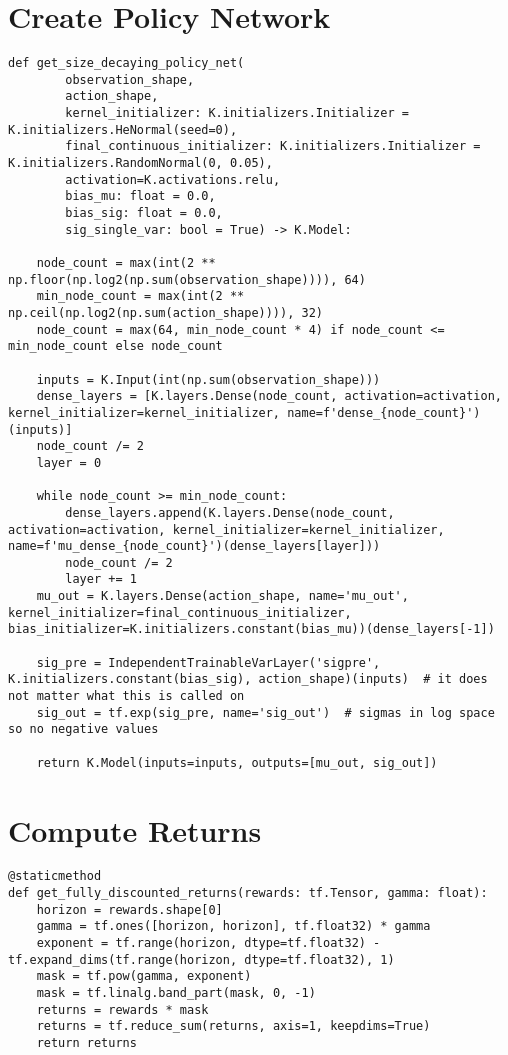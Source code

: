 \section{Create Policy Network}\label{appendix:code:network}
\begin{lstlisting}[basicstyle=\footnotesize]
def get_size_decaying_policy_net(
        observation_shape,
        action_shape,
        kernel_initializer: K.initializers.Initializer = K.initializers.HeNormal(seed=0),
        final_continuous_initializer: K.initializers.Initializer = K.initializers.RandomNormal(0, 0.05),
        activation=K.activations.relu,
        bias_mu: float = 0.0,
        bias_sig: float = 0.0,
        sig_single_var: bool = True) -> K.Model:

    node_count = max(int(2 ** np.floor(np.log2(np.sum(observation_shape)))), 64)
    min_node_count = max(int(2 ** np.ceil(np.log2(np.sum(action_shape)))), 32)
    node_count = max(64, min_node_count * 4) if node_count <= min_node_count else node_count

    inputs = K.Input(int(np.sum(observation_shape)))
    dense_layers = [K.layers.Dense(node_count, activation=activation, kernel_initializer=kernel_initializer, name=f'dense_{node_count}')(inputs)]
    node_count /= 2
    layer = 0
    
    while node_count >= min_node_count:
        dense_layers.append(K.layers.Dense(node_count, activation=activation, kernel_initializer=kernel_initializer, name=f'mu_dense_{node_count}')(dense_layers[layer]))
        node_count /= 2
        layer += 1
    mu_out = K.layers.Dense(action_shape, name='mu_out', kernel_initializer=final_continuous_initializer, bias_initializer=K.initializers.constant(bias_mu))(dense_layers[-1])
    
    sig_pre = IndependentTrainableVarLayer('sigpre', K.initializers.constant(bias_sig), action_shape)(inputs)  # it does not matter what this is called on
    sig_out = tf.exp(sig_pre, name='sig_out')  # sigmas in log space so no negative values

    return K.Model(inputs=inputs, outputs=[mu_out, sig_out])

\end{lstlisting}

\section{Compute Returns}\label{appendix:code:returns}
\begin{lstlisting}[basicstyle=\footnotesize]
@staticmethod
def get_fully_discounted_returns(rewards: tf.Tensor, gamma: float):
    horizon = rewards.shape[0]
    gamma = tf.ones([horizon, horizon], tf.float32) * gamma
    exponent = tf.range(horizon, dtype=tf.float32) - tf.expand_dims(tf.range(horizon, dtype=tf.float32), 1)
    mask = tf.pow(gamma, exponent)
    mask = tf.linalg.band_part(mask, 0, -1)  
    returns = rewards * mask
    returns = tf.reduce_sum(returns, axis=1, keepdims=True)
    return returns
\end{lstlisting}

